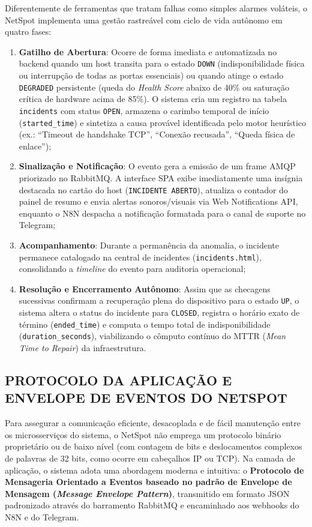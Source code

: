 \documentclass[12pt,a4paper]{article}
\begin{document}
Diferentemente de ferramentas que tratam falhas como simples alarmes voláteis, o NetSpot implementa uma gestão rastreável com ciclo de vida autônomo em quatro fases:
\begin{enumerate}[leftmargin=1.25cm]
\item \textbf{Gatilho de Abertura}: Ocorre de forma imediata e automatizada no backend quando um host transita para o estado \texttt{DOWN} (indisponibilidade física ou interrupção de todas as portas essenciais) ou quando atinge o estado \texttt{DEGRADED} persistente (queda do \textit{Health Score} abaixo de 40\% ou saturação crítica de hardware acima de 85\%). O sistema cria um registro na tabela \texttt{incidents} com status \texttt{OPEN}, armazena o carimbo temporal de início (\texttt{started\_time}) e sintetiza a causa provável identificada pelo motor heurístico (ex.: ``Timeout de handshake TCP'', ``Conexão recusada'', ``Queda física de enlace'');
\item \textbf{Sinalização e Notificação}: O evento gera a emissão de um frame AMQP priorizado no RabbitMQ. A interface SPA exibe imediatamente uma insígnia destacada no cartão do host (\texttt{INCIDENTE ABERTO}), atualiza o contador do painel de resumo e envia alertas sonoros/visuais via Web Notifications API, enquanto o N8N despacha a notificação formatada para o canal de suporte no Telegram;
\item \textbf{Acompanhamento}: Durante a permanência da anomalia, o incidente permanece catalogado na central de incidentes (\texttt{incidents.html}), consolidando a \textit{timeline} do evento para auditoria operacional;
\item \textbf{Resolução e Encerramento Autônomo}: Assim que as checagens sucessivas confirmam a recuperação plena do dispositivo para o estado \texttt{UP}, o sistema altera o status do incidente para \texttt{CLOSED}, registra o horário exato de término (\texttt{ended\_time}) e computa o tempo total de indisponibilidade (\texttt{duration\_seconds}), viabilizando o cômputo contínuo do MTTR (\textit{Mean Time to Repair}) da infraestrutura.
\end{enumerate}

\subsection{PROTOCOLO DA APLICAÇÃO E ENVELOPE DE EVENTOS DO NETSPOT}
Para assegurar a comunicação eficiente, desacoplada e de fácil manutenção entre os microsserviços do sistema, o NetSpot não emprega um protocolo binário proprietário ou de baixo nível (com contagem de bits e deslocamentos complexos de palavras de 32 bits, como ocorre em cabeçalhos IP ou TCP). Na camada de aplicação, o sistema adota uma abordagem moderna e intuitiva: o \textbf{Protocolo de Mensageria Orientado a Eventos baseado no padrão de Envelope de Mensagem (\textit{Message Envelope Pattern})}, transmitido em formato JSON padronizado através do barramento RabbitMQ e encaminhado aos webhooks do N8N e do Telegram.
\end{document}
